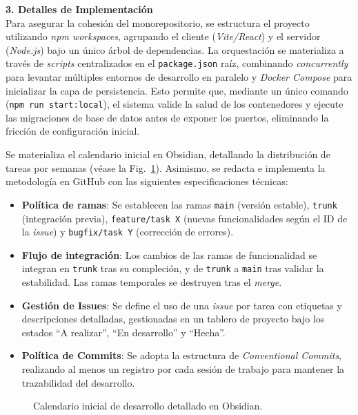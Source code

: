 \textbf{3. Detalles de Implementación} \\
Para asegurar la cohesión del monorepositorio, se estructura el proyecto utilizando \textit{npm workspaces}, agrupando el cliente (\textit{Vite/React}) y el servidor (\textit{Node.js}) bajo un único árbol de dependencias. La orquestación se materializa a través de \textit{scripts} centralizados en el \texttt{package.json} raíz, combinando \textit{concurrently} para levantar múltiples entornos de desarrollo en paralelo y \textit{Docker Compose} para inicializar la capa de persistencia. Esto permite que, mediante un único comando (\texttt{npm run start:local}), el sistema valide la salud de los contenedores y ejecute las migraciones de base de datos antes de exponer los puertos, eliminando la fricción de configuración inicial.

Se materializa el calendario inicial en Obsidian, detallando la distribución de tareas por semanas (véase la Fig.~\ref{fig:calendario_obsidian}). Asimismo, se redacta e implementa la metodología en GitHub con las siguientes especificaciones técnicas:
\begin{itemize}
    \item \textbf{Política de ramas}: Se establecen las ramas \texttt{main} (versión estable), \texttt{trunk} (integración previa), \texttt{feature/task X} (nuevas funcionalidades según el ID de la \textit{issue}) y \texttt{bugfix/task Y} (corrección de errores).
    \item \textbf{Flujo de integración}: Los cambios de las ramas de funcionalidad se integran en \texttt{trunk} tras su compleción, y de \texttt{trunk} a \texttt{main} tras validar la estabilidad. Las ramas temporales se destruyen tras el \textit{merge}.
    \item \textbf{Gestión de Issues}: Se define el uso de una \textit{issue} por tarea con etiquetas y descripciones detalladas, gestionadas en un tablero de proyecto bajo los estados ``A realizar'', ``En desarrollo'' y ``Hecha''.
    \item \textbf{Política de Commits}: Se adopta la estructura de \textit{Conventional Commits}, realizando al menos un registro por cada sesión de trabajo para mantener la trazabilidad del desarrollo.
\end{itemize}

\begin{figure}[H]
\begin{center}
\caption{Calendario inicial de desarrollo detallado en Obsidian.}
\label{fig:calendario_obsidian}
\end{center}
\end{figure}


